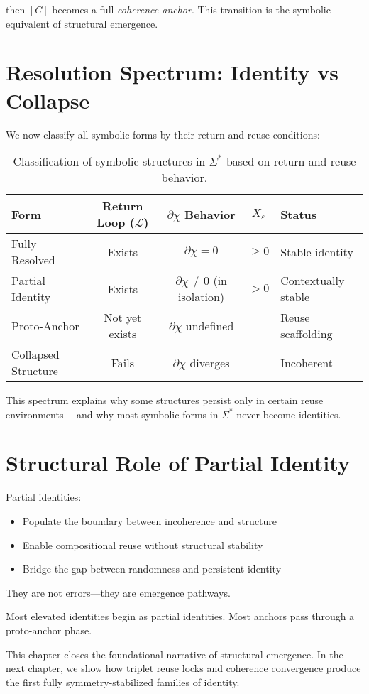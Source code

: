 then $[C]$ becomes a full \emph{coherence anchor}.  
This transition is the symbolic equivalent of structural emergence.

\section{Resolution Spectrum: Identity vs Collapse} \label{resolution-spectrum-identity-vs-collapse}

We now classify all symbolic forms by their return and reuse conditions:

\begin{table}[h!]
\centering
\begin{tabular}{l c c c l}
\toprule
\textbf{Form} & \textbf{Return Loop ($\mathcal{L}$)} & \textbf{$\partial \chi$ Behavior} & \textbf{$X_\varepsilon$} & \textbf{Status} \\
\midrule
Fully Resolved     & Exists           & $\partial \chi = 0$            & $\geq 0$         & Stable identity \\
Partial Identity   & Exists           & $\partial \chi \ne 0$ (in isolation) & $> 0$          & Contextually stable \\
Proto-Anchor       & Not yet exists   & $\partial \chi$ undefined       & ---              & Reuse scaffolding \\
Collapsed Structure & Fails           & $\partial \chi$ diverges        & ---              & Incoherent \\
\bottomrule
\end{tabular}
\caption{Classification of symbolic structures in $\Sigma^*$ based on return and reuse behavior.}
\end{table}

This spectrum explains why some structures persist only in certain reuse environments—  
and why most symbolic forms in $\Sigma^*$ never become identities.

\section{Structural Role of Partial Identity} \label{structural-role-of-partial-identity}

Partial identities:
\begin{itemize}
  \item Populate the boundary between incoherence and structure
  \item Enable compositional reuse without structural stability
  \item Bridge the gap between randomness and persistent identity
\end{itemize}

They are not errors—they are emergence pathways.

Most elevated identities begin as partial identities.  
Most anchors pass through a proto-anchor phase.

This chapter closes the foundational narrative of structural emergence.  
In the next chapter, we show how triplet reuse locks and coherence convergence  
produce the first fully symmetry-stabilized families of identity.
